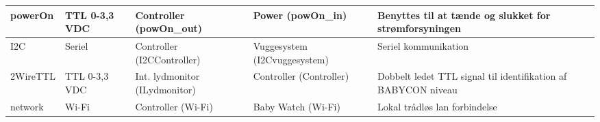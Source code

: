 \begin{center}
\begin{longtable}{|p{}|p{}|p{}|p{}|p{3cm}|}
powerOn			
&TTL 0-3,3 VDC				
&Controller \newline (powOn\_out) 			
&Power \newline (powOn\_in)	
&Benyttes til at tænde og slukket for strømforsyningen   		\\\hline

I2C			
&Seriel				
&Controller \newline (I2CController) 			
&Vuggesystem \newline (I2Cvuggesystem) 	
&Seriel kommunikation
\\\hline

2WireTTL			
&TTL 0-3,3 VDC					
&Int. lydmonitor \newline (ILydmonitor) 			
&Controller \newline (Controller) 	
&Dobbelt ledet TTL signal til identifikation af BABYCON niveau
\\\hline

network			
&Wi-Fi				
&Controller \newline (Wi-Fi) 			
&Baby Watch \newline (Wi-Fi)	
&Lokal trådløs lan forbindelse   				\\\hline

\end{longtable}
\end{center}